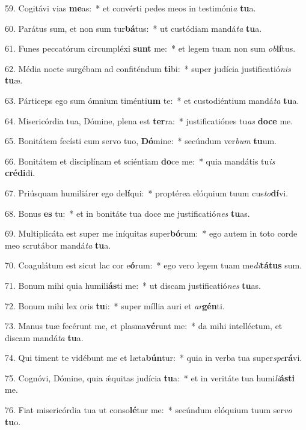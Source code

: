 59. Cogitávi vias \textbf{me}as:~*  et convérti pedes meos in testimóni\textit{a} \textbf{tu}a.\

60. Parátus sum, et non sum tur\textbf{bá}tus:~*  ut custódiam mandá\textit{ta} \textbf{tu}a.\

61. Funes peccatórum circumpléxi \textbf{sunt} me:~*  et legem tuam non sum \textit{ob}\textbf{lí}tus.\

62. Média nocte surgébam ad confiténdum \textbf{ti}bi:~*  super judícia justificatió\textit{nis} \textbf{tu}æ.\

63. Párticeps ego sum ómnium timénti\textbf{um} te:~*  et custodiéntium mandá\textit{ta} \textbf{tu}a.\

64. Misericórdia tua, Dómine, plena est \textbf{ter}ra:~*  justificatiónes tu\textit{as} \textbf{do}\textbf{ce} me.\

65. Bonitátem fecísti cum servo tuo, \textbf{Dó}mine:~*  secúndum ver\textit{bum} \textbf{tu}um.\

66. Bonitátem et disciplínam et sciéntiam \textbf{do}ce me:~*  quia mandátis tu\textit{is} \textbf{cré}\textbf{di}di.\

67. Priúsquam humiliárer ego de\textbf{lí}qui:~*  proptérea elóquium tuum cus\textit{to}\textbf{dí}vi.\

68. Bonus \textbf{es} tu:~*  et in bonitáte tua doce me justificatió\textit{nes} \textbf{tu}as.\

69. Multiplicáta est super me iníquitas super\textbf{bó}rum:~*  ego autem in toto corde meo scrutábor mandá\textit{ta} \textbf{tu}a.\

70. Coagulátum est sicut lac cor e\textbf{ó}rum:~*  ego vero legem tuam me\textit{di}\textbf{tá}\textbf{tus} sum.\

71. Bonum mihi quia humili\textbf{ás}ti me:~*  ut discam justificatió\textit{nes} \textbf{tu}as.\

72. Bonum mihi lex oris \textbf{tu}i:~*  super míllia auri et \textit{ar}\textbf{gén}ti.\

73. Manus tuæ fecérunt me, et plasma\textbf{vé}runt me:~*  da mihi intelléctum, et discam mandá\textit{ta} \textbf{tu}a.\

74. Qui timent te vidébunt me et læta\textbf{bún}tur:~*  quia in verba tua super\textit{spe}\textbf{rá}vi.\

75. Cognóvi, Dómine, quia ǽquitas judícia \textbf{tu}a:~*  et in veritáte tua humi\textit{li}\textbf{ás}\textbf{ti} me.\

76. Fiat misericórdia tua ut conso\textbf{lé}tur me:~*  secúndum elóquium tuum ser\textit{vo} \textbf{tu}o.\

